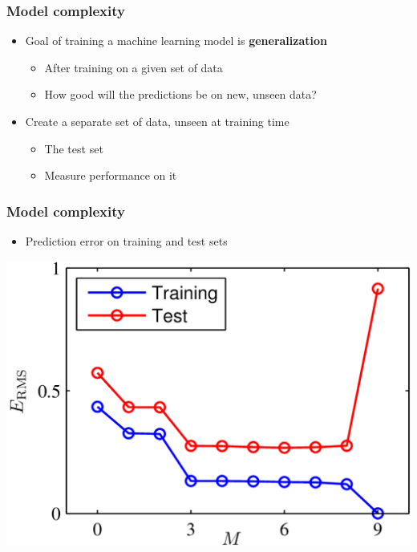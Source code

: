 \documentclass[12pt,notes,mathserif]{beamer}
\begin{document}
\begin{frame}[c]
	\frametitle{Model complexity}
	\begin{itemize}
		\item Goal of training a machine learning model is {\bf generalization}
		      \begin{itemize}
			      \item After training on a given set of data
			      \item How good will the predictions be on new, unseen data?
		      \end{itemize}
		\item Create a separate set of data, unseen at training time
		      \begin{itemize}
			      \item  The test set
			      \item Measure performance on it
		      \end{itemize}
	\end{itemize}
\end{frame}

\begin{frame}[c]
	\frametitle{Model complexity}
	\begin{itemize}
		\item  Prediction error on training and test sets
	\end{itemize}
	\begin{center}
		\includegraphics[width=0.61\linewidth]{fig/lec58.jpg}
	\end{center}
\end{frame}
\end{document}
